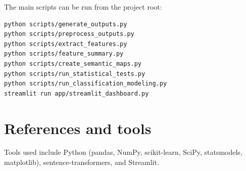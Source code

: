 The main scripts can be run from the project root:
\begin{verbatim}
python scripts/generate_outputs.py
python scripts/preprocess_outputs.py
python scripts/extract_features.py
python scripts/feature_summary.py
python scripts/create_semantic_maps.py
python scripts/run_statistical_tests.py
python scripts/run_classification_modeling.py
streamlit run app/streamlit_dashboard.py
\end{verbatim}

\section{References and tools}
Tools used include Python (pandas, NumPy, scikit-learn, SciPy, statsmodels, matplotlib), sentence-transformers, and Streamlit.

\printbibliography


